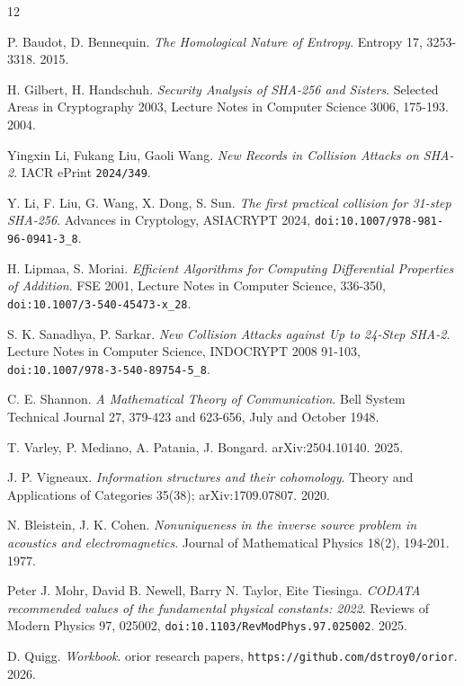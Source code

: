\backmatter
{}
\begin{thebibliography}{12}

P. Baudot, D. Bennequin. \emph{The Homological Nature of Entropy}. Entropy 17, 3253-3318. 2015.

H. Gilbert, H. Handschuh. \emph{Security Analysis of SHA-256 and Sisters}. Selected Areas in Cryptography 2003, Lecture Notes in Computer Science 3006, 175-193. 2004.

Yingxin Li, Fukang Liu, Gaoli Wang. \emph{New Records in Collision Attacks on SHA-2}. IACR ePrint \texttt{2024/\allowbreak{}349}.

Y. Li, F. Liu, G. Wang, X. Dong, S. Sun. \emph{The first practical collision for 31-step SHA-256}. Advances in Cryptology, ASIACRYPT 2024, \texttt{doi:10.1007/\allowbreak{}978-981-96-0941-3\_\allowbreak{}8}.

H. Lipmaa, S. Moriai. \emph{Efficient Algorithms for Computing Differential Properties of Addition}. FSE 2001, Lecture Notes in Computer Science, 336-350, \texttt{doi:10.1007/\allowbreak{}3-540-45473-x\_\allowbreak{}28}.

S. K. Sanadhya, P. Sarkar. \emph{New Collision Attacks against Up to 24-Step SHA-2}. Lecture Notes in Computer Science, INDOCRYPT 2008 91-103, \texttt{doi:10.1007/\allowbreak{}978-3-540-89754-5\_\allowbreak{}8}.

C. E. Shannon. \emph{A Mathematical Theory of Communication}. Bell System Technical Journal 27, 379-423 and 623-656, July and October 1948.

T. Varley, P. Mediano, A. Patania, J. Bongard. arXiv:2504.10140. 2025.

J. P. Vigneaux. \emph{Information structures and their cohomology}. Theory and Applications of Categories 35(38); arXiv:1709.07807. 2020.

N. Bleistein, J. K. Cohen. \emph{Nonuniqueness in the inverse source problem in acoustics and electromagnetics}. Journal of Mathematical Physics 18(2), 194-201. 1977.

Peter J. Mohr, David B. Newell, Barry N. Taylor, Eite Tiesinga. \emph{CODATA recommended values of the fundamental physical constants: 2022}. Reviews of Modern Physics 97, 025002, \texttt{doi:10.1103/\allowbreak{}RevModPhys.97.025002}. 2025.

D. Quigg. \emph{Workbook}. orior research papers, \texttt{https:/\allowbreak{}/\allowbreak{}github.com/\allowbreak{}dstroy0/\allowbreak{}orior}. 2026.

\end{thebibliography}
